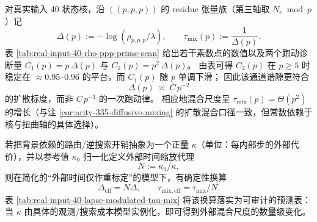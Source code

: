 \begin{remark}\label{rem:real-input-40-gap-diffusive-running}
对真实输入 40 状态核，沿 \(((p,p,p))\) 的 residue 张量族（第三轴取 \(N_e\bmod p\)）记
\[
\Delta(p):=-\log(\rho_{p,p,p}/\lambda),\qquad
\tau_{\mathrm{mix}}(p):=\frac{1}{\Delta(p)}.
\]
表 \ref{tab:real-input-40-rho-ppp-prime-scan} 给出若干素数点的数值以及两个跑动诊断量
\(
C_1(p)=p\,\Delta(p)
\)
与
\(
C_2(p)=p^2\,\Delta(p)
\)。
由表可得 \(C_2(p)\) 在 \(p\ge 5\) 时稳定在 \(\approx 0.95\text{--}0.96\) 的平台，而 \(C_1(p)\) 随 \(p\) 单调下滑；
因此该通道谱隙更符合
\[
\Delta(p)\ \asymp\ C\,p^{-2}
\]
的扩散标度，而非 \(C\,p^{-1}\) 的一次跑动律。
相应地混合尺度呈 \(\tau_{\mathrm{mix}}(p)=\Theta(p^2)\) 的增长（与注 \ref{cor:arity-335-diffusive-mixing} 的扩散混合口径一致，但常数依赖于核与扭曲轴的具体选择）。
\end{remark}


\begin{remark}[外部时间缩放代理下的混合时间重标定]\label{rem:lapse-modulated-tau-mix}
若把背景依赖的路由/逆搜索开销抽象为一个正量 \(\kappa\)（单位：每内部步的外部代价），并以参考值 \(\kappa_0\) 归一化定义外部时间缩放代理
\[
N:=\kappa_0/\kappa,
\]
则在简化的“外部时间仅作重标定”的模型下，有确定性换算
\[
\Delta_{\mathrm{eff}}=N\Delta,\qquad
\tau_{\mathrm{mix,eff}}=\tau_{\mathrm{mix}}/N.
\]
表 \ref{tab:real-input-40-lapse-modulated-tau-mix} 将该换算落实为可审计的预测表：当 \(\kappa\) 由具体的观测/搜索成本模型实例化，即可得到外部混合尺度的数量级变化。
\end{remark}

